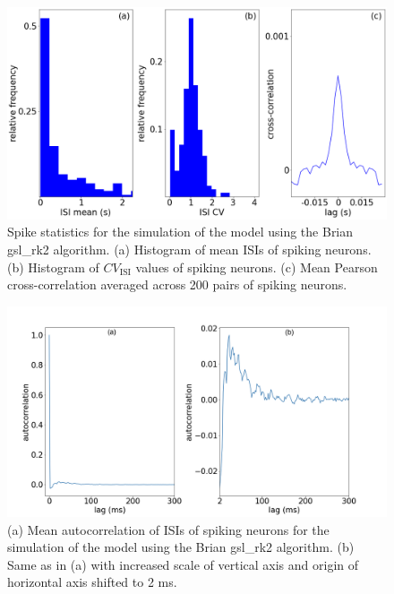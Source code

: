 \begin{figure}[H]
    \centering
    \includegraphics[scale=0.3]{Figures/Fig10.png}
    \caption{Spike statistics for the simulation of the model using the Brian gsl\_rk2 algorithm. (a) Histogram of mean ISIs of spiking neurons. (b) Histogram of $CV_{\text{ISI}}$ values of spiking neurons. (c) Mean Pearson cross-correlation averaged across 200 pairs of spiking neurons.}
    \label{fig:fig10}
\end{figure}

\begin{figure}[H]
    \centering
    \includegraphics[scale=0.3]{Figures/Fig11.png}
    \caption{(a) Mean autocorrelation of ISIs of spiking neurons for the simulation of the model using the Brian gsl\_rk2 algorithm. (b) Same as in (a) with increased scale of vertical axis and origin of horizontal axis shifted to 2 ms.}
    \label{fig:fig11}
\end{figure}

